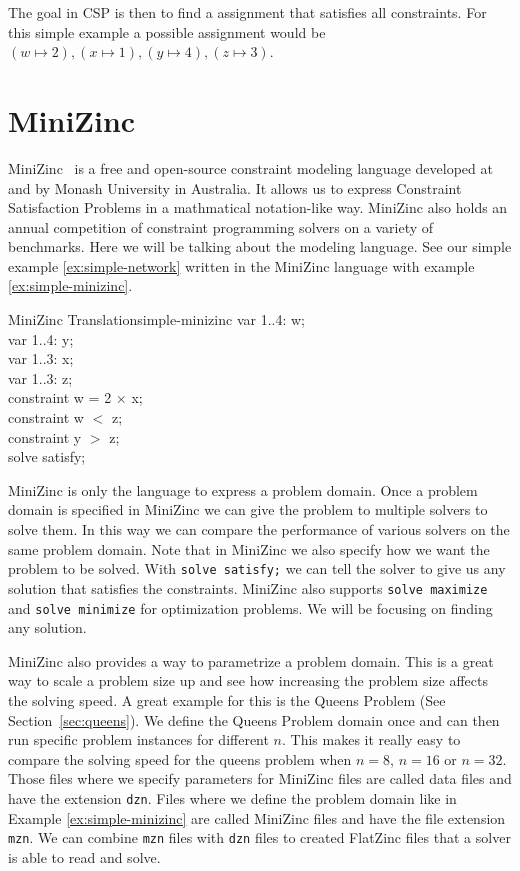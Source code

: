 The goal in CSP is then to find a assignment that satisfies all constraints. For this simple example a possible assignment would be $(w \mapsto 2), (x \mapsto 1), (y \mapsto 4), (z \mapsto 3)$.

\section{MiniZinc}

MiniZinc~\cite{minizinc:2007} is a free and open-source constraint modeling language developed at and by Monash University in Australia. It allows us to express Constraint Satisfaction Problems in a mathmatical notation-like way. MiniZinc also holds an annual competition of constraint programming solvers on a variety of benchmarks. Here we will be talking about the modeling language. See our simple example \ref{ex:simple-network} written in the MiniZinc language with example \ref{ex:simple-minizinc}.

\begin{example}{MiniZinc Translation}{simple-minizinc}
	var 1..4: w; \\
	var 1..4: y; \\
	var 1..3: x; \\
	var 1..3: z; \\

	constraint w = 2 $\times$ x; \\
	constraint w $<$ z; \\
	constraint y $>$ z; \\

	solve satisfy;
\end{example}

MiniZinc is only the language to express a problem domain. Once a problem domain is specified in MiniZinc we can give the problem to multiple solvers to solve them. In this way we can compare the performance of various solvers on the same problem domain. Note that in MiniZinc we also specify how we want the problem to be solved. With \verb|solve satisfy;| we can tell the solver to give us any solution that satisfies the constraints. MiniZinc also supports \verb|solve maximize| and \verb|solve minimize| for optimization problems. We will be focusing on finding any solution.

MiniZinc also provides a way to parametrize a problem domain. This is a great way to scale a problem size up and see how increasing the problem size affects the solving speed. A great example for this is the Queens Problem (See Section~\ref{sec:queens}). We define the Queens Problem domain once and can then run specific problem instances for different $n$. This makes it really easy to compare the solving speed for the queens problem when $n = 8$, $n = 16$ or $n = 32$. Those files where we specify parameters for MiniZinc files are called data files and have the extension \verb|dzn|. Files where we define the problem domain like in Example \ref{ex:simple-minizinc} are called MiniZinc files and have the file extension \verb|mzn|. We can combine \verb|mzn| files with \verb|dzn| files to created FlatZinc files that a solver is able to read and solve.

